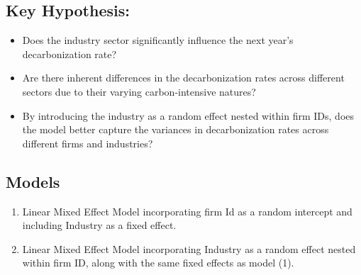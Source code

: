 \subsection{Key Hypothesis:}
\begin{itemize}
    \item Does the industry sector significantly influence the next year's decarbonization rate?
    \item Are there inherent differences in the decarbonization rates across different sectors due to their varying carbon-intensive natures?
    \item By introducing the industry as a random effect nested within firm IDs, does the model better capture the variances in decarbonization rates across different firms and industries?
\end{itemize}

\subsection{Models} 
\begin{enumerate}
    \item Linear Mixed Effect Model incorporating firm Id as a random intercept and including Industry as a fixed effect.
    \item Linear Mixed Effect Model incorporating Industry as a random effect nested within firm ID, along with the same fixed effects as model (1).
\end{enumerate}




